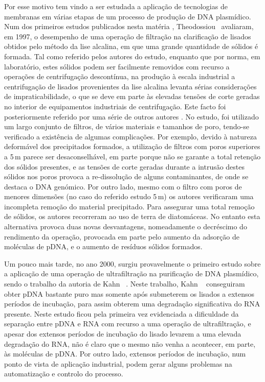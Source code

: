 Por esse motivo tem vindo a ser estudada a aplicação de tecnologias de membranas em várias etapas de um processo de produção de DNA plasmídico. Num dos primeiros estudos publicados nesta matéria \cite{theo}, Theodossiou \et\ avaliaram, em 1997, o desempenho de uma operação de filtração na clarificação de lisados obtidos pelo método da lise alcalina, em que uma grande quantidade de sólidos é formada. 
Tal como referido pelos autores do estudo, enquanto que por norma, em laboratório, estes sólidos podem ser facilmente removidos com recurso a operações de centrifugação descontínua, na produção à escala industrial a centrifugação de lisados provenientes da lise alcalina levanta sérias considerações de impraticabilidade, o que se deve em parte às elevadas tensões de corte geradas no interior de equipamentos industriais de centrifugação. Este facto foi posteriormente referido por uma série de outros autores \cite{blom,mahony,kong10,duval2,zhu}. 
No estudo, foi utilizado um largo conjunto de filtros, de vários materiais e tamanhos de poro, tendo-se verificado a existência de algumas complicações. Por exemplo, devido à natureza deformável dos precipitados formados, a utilização de filtros com poros superiores a 5\,\micro m parece ser desaconselhável, em parte porque não se garante a total retenção dos sólidos presentes, e as tensões de corte geradas durante a intrusão destes sólidos nos poros provoca a re-dissolução de alguns contaminantes, de onde se destaca o DNA genómico. Por outro lado, mesmo com o filtro com poros de menores dimensões (no caso do referido estudo 5\,\micro m) os autores verificaram uma incompleta remoção do material precipitado. Para assegurar uma total remoção de sólidos, os autores recorreram ao uso de terra de diatomáceas. No entanto esta alternativa provoca duas novas desvantagens, nomeadamente o decréscimo do rendimento da operação, provocada em parte pelo aumento da adsorção de moléculas de pDNA, e o aumento de resíduos sólidos formados.  

Um pouco mais tarde, no ano 2000, surgiu provavelmente o primeiro estudo sobre a aplicação de uma operação de ultrafiltração na purificação de DNA plasmídico, sendo o trabalho da autoria de Kahn \et\ \cite{kahn}. Neste trabalho, Kahn \et\ \cite{kahn} conseguiram obter pDNA bastante puro mas somente após submeterem os lisados a extensos períodos de incubação, para assim obterem uma degradação significativa do RNA presente. Neste estudo ficou pela primeira vez evidenciada a dificuldade da separação entre pDNA e RNA com recurso a uma operação de ultrafiltração, e apesar dos extensos períodos de incubação do lisado levarem a uma elevada degradação do RNA, não é claro que o mesmo não venha a acontecer, em parte, às moléculas de pDNA. Por outro lado, extensos períodos de incubação, num ponto de vista de aplicação industrial, podem gerar alguns problemas na automatização e controlo do processo.  

